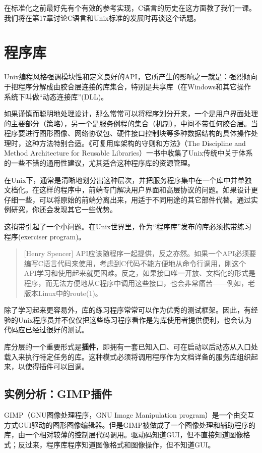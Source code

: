 \documentclass[12pt,oneside]{book}
\begin{document}
\begin{common-format}
在标准化之前最好先有个有效的参考实现，C语言的历史在这方面教了我们一课。我们将在第17章讨论C语言和Unix标准的发展时再谈这个话题。


\section{程序库}
Unix编程风格强调模块性和定义良好的API，它所产生的影响之一就是：强烈倾向于把程序分解成由胶合层连接的库集合，特别是共享库（在Windows和其它操作系统下叫做“动态连接库”(DLL)。

如果谨慎而聪明地处理设计，那么常常可以将程序划分开来，一个是用户界面处理的主要部分（策略），另一个是服务例程的集合（机制），中间不带任何胶合层。当程序要进行图形图像、网络协议包、硬件接口控制块等多种数据结构的具体操作处理时，这种方法特别合适。《可复用库架构的守则和方法》（The Discipline and Method Architecture for Reusable Libraries）\cite{Vo}一书中收集了Unix传统中关于体系的一些不错的通用性建议，尤其适合这种程序库的资源管理。

在Unix下，通常是清晰地划分出这种层次，并把服务程序集中在一个库中并单独文档化。在这样的程序中，前端专门解决用户界面和高层协议的问题。如果设计更仔细一些，可以将原始的前端分离出来，用适于不同用途的其它部件代替。通过实例研究，你还会发现其它一些优势。

这捎带引起了一个小问题。在Unix世界里，作为“程序库”发布的库必须携带练习程序(exerciser program)。

\begin{quote}[Henry Spencer]
API应该随程序一起提供，反之亦然。如果一个API必须要编写C语言代码来使用，考虑到C代码不能方便地从命令行调用，刚这个API学习和使用起来就更困难。反之，如果接口唯一开放、文档化的形式是程序，而无法方便地从C程序中调用这些接口，也会非常痛苦——例如，老版本Linux中的route(1)。
\end{quote}

除了学习起来更容易外，库的练习程序常常可以作为优秀的测试框架。因此，有经验的Unix程序员并不仅仅把这些练习程序看作是为库使用者提供便利，也会认为代码应已经过很好的测试。

库分层的一个重要形式是\textbf{插件}，即拥有一套已知入口、可在启动以后动态从入口处载入来执行特定任务的库。这种模式必须将调用程序作为文档详备的服务库组织起来，以使得插件可以回调。


\subsection{实例分析：GIMP插件}
GIMP（GNU图像处理程序，GNU Image Manipulation program）是一个由交互方式GUI驱动的图形图像编辑器。但是GIMP被做成了一个图像处理和辅助程序的库，由一个相对较薄的控制层代码调用。驱动码知道GUI，但不直接知道图像格式；反过来，程序库程序知道图像格式和图像操作，但不知道GUI。


\end{common-format}
\end{document}
